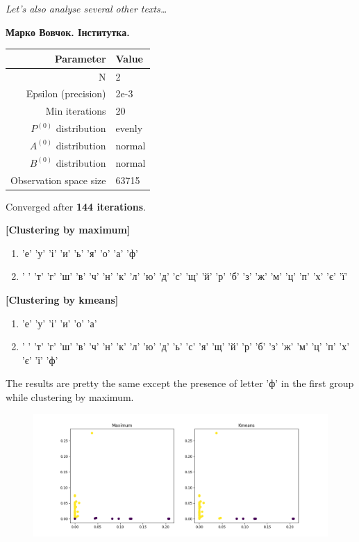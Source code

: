 \documentclass[12pt,a4paper]{article}
\begin{document}
  \textit{Let's also analyse several other texts\ldots}


  \textbf{Марко Вовчок. Інститутка.}


  \begin{center}
  \begin{tabular}{ | r | l | }
    \hline
    Parameter & Value \\
    \hline
    N & 2 \\
    \hline
    Epsilon (precision) & 2e-3 \\
    \hline
    Min iterations & 20 \\
    \hline
    $P^{(0)}$ distribution & evenly \\
    \hline
    $A^{(0)}$ distribution & normal \\
    \hline
    $B^{(0)}$ distribution & normal \\
    \hline
    Observation space size & 63715 \\
    \hline
  \end{tabular}
  \end{center}

  Converged after \textbf{144 iterations}.

  \textbf{[Clustering by maximum]}
  \begin{enumerate}
    \item 'е' 'у' 'і' 'и' 'ь' 'я' 'о' 'а' 'ф'
    \item ' ' 'т' 'г' 'ш' 'в' 'ч' 'н' 'к' 'л' 'ю' 'д' 'с' 'щ' 'й' 'р' 'б' 'з' 'ж'
 'м' 'ц' 'п' 'х' 'є' 'ї'
  \end{enumerate}

  \textbf{[Clustering by kmeans]}
  \begin{enumerate}
    \item 'е' 'у' 'і' 'и' 'о' 'а'
    \item ' ' 'т' 'г' 'ш' 'в' 'ч' 'н' 'к' 'л' 'ю' 'д' 'ь' 'с' 'я' 'щ' 'й' 'р' 'б'
 'з' 'ж' 'м' 'ц' 'п' 'х' 'є' 'ї' 'ф'
  \end{enumerate}

  The results are pretty the same except the presence of letter 'ф' in the first group
  while clustering by maximum.

  \begin{figure}[h]
    \includegraphics[width=\textwidth]{../plots/marko-instutytka-clustering-1670779387.3225758.png}
    \centering
  \end{figure}
	
\end{document}
